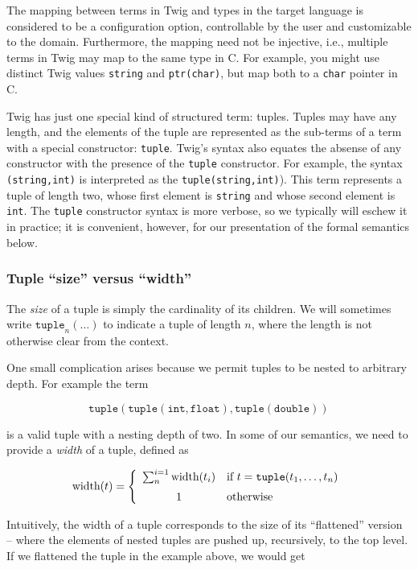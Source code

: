 The mapping between terms in Twig and types in the target language is considered to be a configuration option, controllable by the user and customizable to the domain. Furthermore, the mapping need not be injective, i.e., multiple terms in Twig may map to the same type in C. For example, you might use distinct Twig values \texttt{string} and \texttt{ptr(char)}, but map both to a \texttt{char} pointer in C.

Twig has just one special kind of structured term: tuples. Tuples may have any length, and the elements of the tuple are represented as the sub-terms of a term with a special constructor: \texttt{tuple}. Twig's syntax also equates the absense of any constructor with the presence of the \texttt{tuple} constructor. For example, the syntax \texttt{(string,int)} is interpreted as the \texttt{tuple(string,int)}). This term represents a tuple of length two, whose first element is \texttt{string} and whose second element is \texttt{int}. The \texttt{tuple} constructor syntax is more verbose, so we typically will eschew it in practice; it is convenient, however, for our presentation of the formal semantics below.

\subsubsection{Tuple ``size'' versus ``width''}

The \emph{size} of a tuple is simply the cardinality of its children. We will sometimes write $\mathtt{tuple}_n(\ldots)$ to indicate a tuple of length $n$, where the length is not otherwise clear from the context.

One small complication arises because we permit tuples to be nested to arbitrary depth. For example the term

\[
\mathtt{tuple(tuple(int,float),tuple(double))} 
\]

is a valid tuple with a nesting depth of two. In some of our semantics, we need to provide a \emph{width} of a tuple, defined as 

\[
\mbox{width}(t) = \left\{
  \begin{array}{cl}
    \sum^{i=1}_{n} \mbox{width}(t_i) 
      & \mbox{if } t = \mathtt{tuple}(t_1,\ldots,t_n)\vspace{2mm}\\
    1 & \mbox{otherwise}
  \end{array}
\right.
\]

Intuitively, the width of a tuple corresponds to the size of its ``flattened'' version -- where the elements of nested tuples are pushed up, recursively, to the top level. If we flattened the tuple in the example above, we would get

